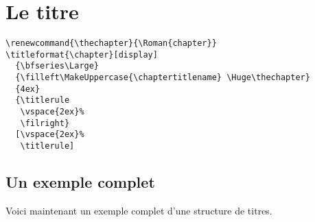 \documentclass[a4paper]{ltxguide}
\begin{document}
\section[Annexes]{Le titre}

\begin{verbatim}
\renewcommand{\thechapter}{\Roman{chapter}}
\titleformat{\chapter}[display]
  {\bfseries\Large}
  {\filleft\MakeUppercase{\chaptertitlename} \Huge\thechapter}
  {4ex}
  {\titlerule
   \vspace{2ex}%
   \filright}
  [\vspace{2ex}%
   \titlerule]
\end{verbatim}

\setcounter{section}{9}
\endgroup

\bigskip 

\subsection{Un exemple complet}

Voici maintenant un exemple complet d'une structure de titres.
\end{document}
